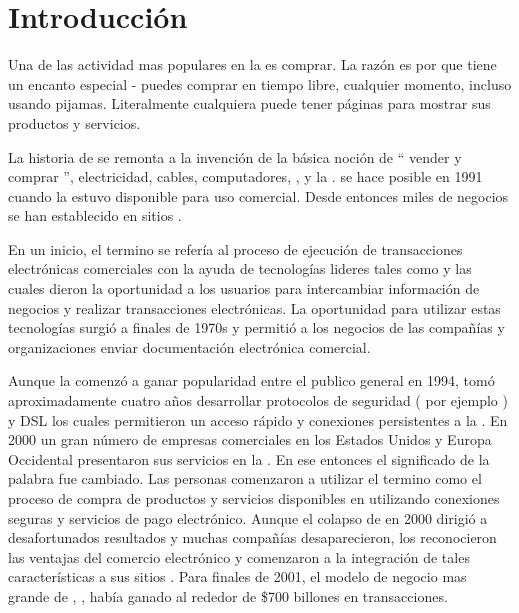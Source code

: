 \chapter{Introducción}\label{cap:intro}


Una de las actividad mas populares en la \web es comprar. La razón es por que tiene un encanto especial - puedes comprar en tiempo libre, cualquier momento, incluso usando pijamas. Literalmente cualquiera puede tener páginas para mostrar sus productos y servicios.

La historia de \ecommerce se remonta a la invención de la básica noción de “ vender y comprar ”, electricidad, cables, computadores, \modems, y la \internet. \ecommerce se hace posible en 1991 cuando la \internet estuvo disponible para uso comercial. Desde entonces miles de negocios se han establecido en sitios \web.

En un inicio, el termino \ecommerce se refería al proceso de ejecución  de transacciones electrónicas comerciales con la ayuda de tecnologías lideres tales como \edimeaning y \eftmeaning las cuales dieron la oportunidad a los usuarios para intercambiar información de negocios y realizar transacciones electrónicas. La oportunidad para utilizar estas tecnologías surgió a finales de 1970s y permitió a los negocios de las compañías y organizaciones enviar documentación electrónica comercial.

Aunque la \internet comenzó a ganar popularidad  entre el publico general en 1994, tomó aproximadamente cuatro años desarrollar protocolos de seguridad ( por ejemplo \http) y DSL los cuales permitieron un acceso rápido y conexiones persistentes a la \internet. En 2000 un gran número de empresas comerciales en los Estados Unidos y Europa Occidental presentaron sus servicios en la \www. En ese entonces el significado de la palabra \ecommerce fue cambiado. Las personas comenzaron a utilizar el termino \ecommerce como el proceso de compra de productos y servicios disponibles en \internet utilizando conexiones seguras y servicios de pago electrónico. Aunque el colapso de \dotcom en 2000 dirigió a desafortunados resultados y muchas compañías \ecommerce desaparecieron, los \retailers \brickandmortar reconocieron las ventajas del comercio electrónico y comenzaron a la integración de tales características a sus sitios \web. Para finales de 2001, el modelo de negocio mas grande de \ecommerce, \btob, había ganado al rededor de \$700 billones en transacciones.

